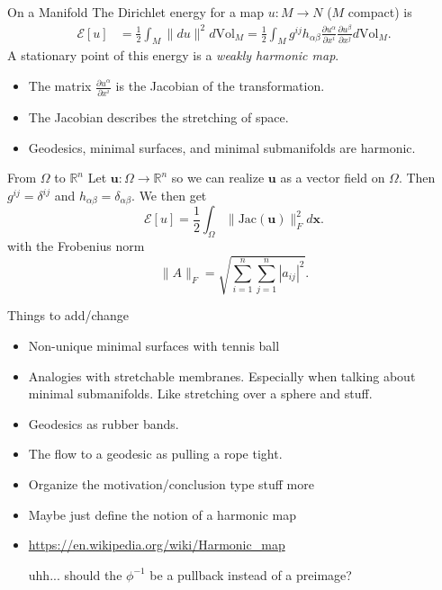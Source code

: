 \documentclass[usenames,dvipsnames]{beamer}
\theoremstyle{definition}
\newtheorem*{question}{Question}
\theoremstyle{theorem}
\newcommand{\R}{\mathbb{R}}
\begin{document}
    \begin{frame}{On a Manifold}
        The Dirichlet energy for a map $u \colon M \to N$ ($M$ compact) is
        \begin{align*}
        \mathcal{E}[u] &=\frac{1}{2} \int_{M} \|du\|^2 d\textrm{Vol}_M = \frac{1}{2} \int_{M}g^{ij}h_{\alpha \beta} \frac{\partial u^\alpha}{\partial x^i}\frac{\partial u^\beta}{\partial x^j}d\textrm{Vol}_M.
        \end{align*}
        A stationary point of this energy is a \emph{weakly harmonic map}.
        \begin{itemize}
            \item The matrix $\frac{\partial u^\alpha}{\partial x^i}$ is the Jacobian of the transformation.
            \item The Jacobian describes the stretching of space.
            \item Geodesics, minimal surfaces, and minimal submanifolds are harmonic.
        \end{itemize}
    \end{frame}
    
    
    \begin{frame}{From $\Omega$ to $\R^n$}
        Let $\mathbf{u}\colon \Omega \to \R^n$ so we can realize $\mathbf{u}$ as a vector field on $\Omega$. Then $g^{ij}=\delta^{ij}$ and $h_{\alpha \beta}=\delta_{\alpha \beta}$. We then get
        \[
        \mathcal{E}[u] = \frac{1}{2} \int_{\Omega} \|\textrm{Jac}(\mathbf{u})\|_{F}^2 d\mathbf{x}.
        \]
        with the Frobenius norm
        \[
        \|A\|_F = \sqrt{\sum_{i=1}^n \sum_{j=1}^n |a_{ij}|^2}.
        \]
    \end{frame}
    


\begin{frame}{Things to add/change}
\begin{itemize}
    \item Non-unique minimal surfaces with tennis ball
    \item Analogies with stretchable membranes. Especially when talking about minimal submanifolds.  Like stretching over a sphere and stuff. 
    \item Geodesics as rubber bands.
    \item The flow to a geodesic as pulling a rope tight.
    \item Organize the motivation/conclusion type stuff more
    \item Maybe just define the notion of a harmonic map
    \item 
    \url{https://en.wikipedia.org/wiki/Harmonic_map}
        
        uhh... should the $\phi^{-1}$ be a pullback instead of a preimage?
\end{itemize}
\end{frame}
\end{document}
